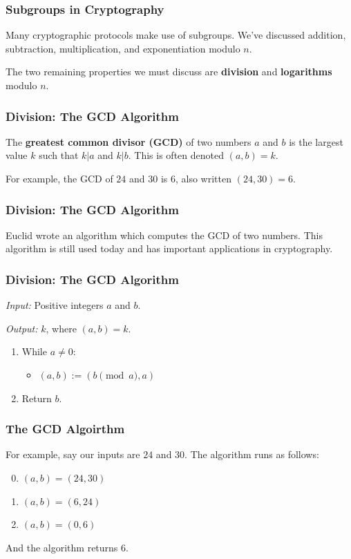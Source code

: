 \documentclass{beamer}
\newcommand{\<}{\langle}
\renewcommand{\>}{\rangle}
\begin{document}
\begin{frame}
\frametitle{Subgroups in Cryptography}

Many cryptographic protocols make use of subgroups. We've discussed addition, subtraction, multiplication, and exponentiation modulo $n$.\newline

The two remaining properties we must discuss are \textbf{division} and \textbf{logarithms} modulo $n$.
\end{frame}


\begin{frame}
\frametitle{Division: The GCD Algorithm}

The \textbf{greatest common divisor (GCD)} of two numbers $a$ and $b$ is the largest value $k$ such that $k|a$ and $k|b$. This is often denoted $(a,b) = k$.\newline

For example, the GCD of $24$ and $30$ is $6$, also written $(24, 30) = 6$.
\end{frame}




\begin{frame}
\frametitle{Division: The GCD Algorithm}

Euclid wrote an algorithm which computes the GCD of two numbers. This algorithm is still used today and has important applications in cryptography.
\end{frame}


\begin{frame}
\frametitle{Division: The GCD Algorithm}

\emph{Input:} Positive integers $a$ and $b$.

\emph{Output:} $k$, where $(a, b) = k$.

\begin{enumerate}[(1)]
\item  While $a \ne 0$:
	\begin{itemize}
	\item $(a,b) := (b\pmod a, a)$
	\end{itemize}
\item Return $b$.
\end{enumerate}
\end{frame}


\begin{frame}
\frametitle{The GCD Algoirthm}

For example, say our inputs are $24$ and $30$. The algorithm runs as follows:
\begin{enumerate}[Loop 1:]
\setcounter{enumi}{-1}
\item $(a, b) = (24, 30)$
\item $(a, b) = (6, 24)$
\item $(a, b) = (0, 6)$
\end{enumerate}
And the algorithm returns $6$.
\end{frame}
\end{document}
